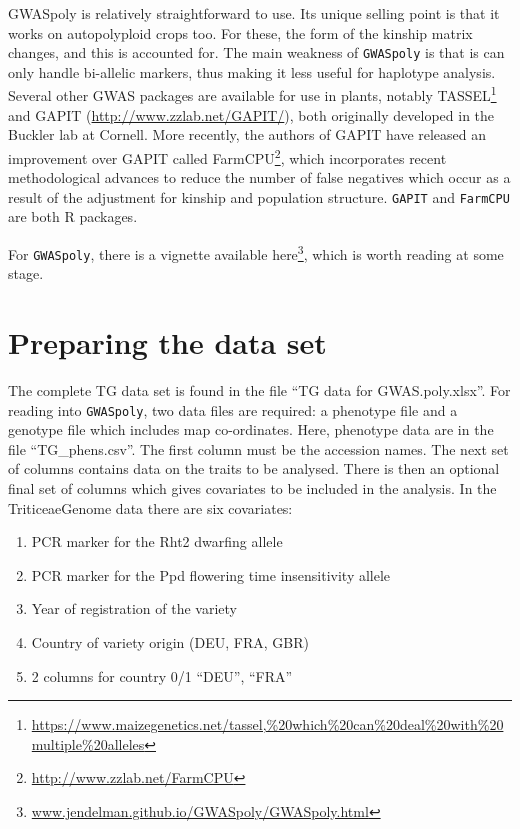 \documentclass[
]{book}
\providecommand{\tightlist}{%
  \setlength{\itemsep}{0pt}\setlength{\parskip}{0pt}}
\renewcommand{\href}[2]{#2\footnote{\url{#1}}}
\begin{document}
GWASpoly is relatively straightforward to use. Its unique selling point is that it works on autopolyploid crops too. For these, the form of the kinship matrix changes, and this is accounted for. The main weakness of \texttt{GWASpoly} is that is can only handle bi-allelic markers, thus making it less useful for haplotype analysis. Several other GWAS packages are available for use in plants, notably \href{https://www.maizegenetics.net/tassel,\%20which\%20can\%20deal\%20with\%20multiple\%20alleles}{TASSEL} and GAPIT (\url{http://www.zzlab.net/GAPIT/}), both originally developed in the Buckler lab at Cornell. More recently, the authors of GAPIT have released an improvement over GAPIT called \href{http://www.zzlab.net/FarmCPU}{FarmCPU}, which incorporates recent methodological advances to reduce the number of false negatives which occur as a result of the adjustment for kinship and population structure. \texttt{GAPIT} and \texttt{FarmCPU} are both R packages.

For \texttt{GWASpoly}, there is a vignette available \href{www.jendelman.github.io/GWASpoly/GWASpoly.html}{here}, which is worth reading at some stage.

\hypertarget{preparing-the-data-set}{%
\section{Preparing the data set}\label{preparing-the-data-set}}

The complete TG data set is found in the file ``TG data for GWAS.poly.xlsx''. For reading into \texttt{GWASpoly}, two data files are required: a phenotype file and a genotype file which includes map co-ordinates. Here, phenotype data are in the file ``TG\_phens.csv''. The first column must be the accession names. The next set of columns contains data on the traits to be analysed. There is then an optional final set of columns which gives covariates to be included in the analysis. In the TriticeaeGenome data there are six covariates:

\begin{enumerate}
\def\labelenumi{\arabic{enumi}.}
\tightlist
\item
  PCR marker for the Rht2 dwarfing allele
\item
  PCR marker for the Ppd flowering time insensitivity allele
\item
  Year of registration of the variety
\item
  Country of variety origin (DEU, FRA, GBR)
\item
  2 columns for country 0/1 ``DEU'', ``FRA''
\end{enumerate}
\end{document}
